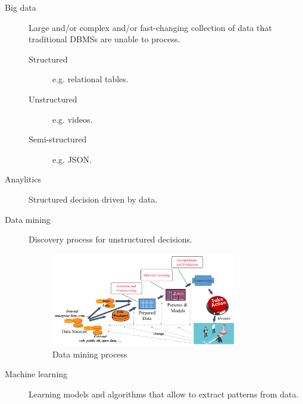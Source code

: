 \begin{description}
    \item[Big data] 
        Large and/or complex and/or fast-changing collection of data that traditional DBMSs are unable to process.
        \begin{description}
            \item[Structured] e.g. relational tables.
            \item[Unstructured] e.g. videos.
            \item[Semi-structured] e.g. JSON.   
        \end{description}

    \item[Anaylitics] 
        Structured decision driven by data.

    \item[Data mining] 
        Discovery process for unstructured decisions.
        \begin{figure}[H]
            \centering
            \includegraphics[width=0.8\textwidth]{img/data_mining_process.png}
            \caption{Data mining process}
        \end{figure}

    \item[Machine learning] 
        Learning models and algorithms that allow to extract patterns from data.
\end{description}